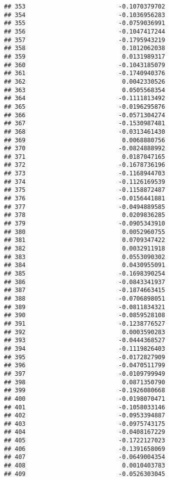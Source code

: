 \documentclass[
]{article}
\begin{document}
\begin{verbatim}
## 353                          -0.1070379702
## 354                          -0.1036956283
## 355                          -0.0759036991
## 356                          -0.1047417244
## 357                          -0.1795943219
## 358                           0.1012062038
## 359                           0.0131989317
## 360                          -0.1043185079
## 361                          -0.1740940376
## 362                           0.0042330526
## 363                           0.0505568354
## 364                          -0.1111813492
## 365                          -0.0196295876
## 366                          -0.0571304274
## 367                          -0.1530987481
## 368                          -0.0313461430
## 369                           0.0068880756
## 370                          -0.0824888992
## 371                           0.0187047165
## 372                          -0.1678736196
## 373                          -0.1168944703
## 374                          -0.1126169539
## 375                          -0.1158872487
## 376                          -0.0156441881
## 377                          -0.0494889585
## 378                           0.0209836285
## 379                          -0.0905343910
## 380                           0.0052960755
## 381                           0.0709347422
## 382                           0.0032911918
## 383                           0.0553090302
## 384                           0.0430955091
## 385                          -0.1698390254
## 386                          -0.0843341937
## 387                          -0.1874663415
## 388                          -0.0706898051
## 389                          -0.0811834321
## 390                          -0.0859528108
## 391                          -0.1238776527
## 392                           0.0003590283
## 393                          -0.0444368527
## 394                          -0.1119826403
## 395                          -0.0172827909
## 396                          -0.0470511799
## 397                          -0.0109799949
## 398                           0.0871350790
## 399                          -0.1926080668
## 400                          -0.0198070471
## 401                          -0.1058033146
## 402                          -0.0953394887
## 403                          -0.0975743175
## 404                          -0.0408167229
## 405                          -0.1722127023
## 406                          -0.1391658069
## 407                          -0.0649004354
## 408                           0.0010403783
## 409                          -0.0526303045

\end{verbatim}
\end{document}
